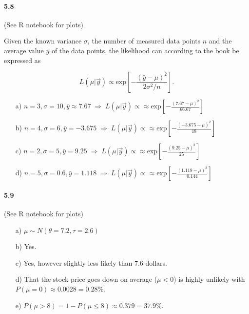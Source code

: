 \documentclass[fontsize=11pt,DIV=18,parskip=half]{scrartcl}
\begin{document}
\paragraph{5.8} (See R notebook for plots)

Given the known variance $\sigma$, the number of measured data points $n$ and the average value $\bar{y}$ of the data points, the likelihood can according to the book be expressed as

\begin{equation*}
L(\mu|\vec{y}) \propto \text{exp}\left[-\frac{(\bar{y}-\mu)^2}{2\sigma^2/n}\right].
\end{equation*}

\begin{enumerate}
\item[a)] $n = 3, \sigma=10, \bar{y}\approx 7.67\; \Rightarrow \; L(\mu|\vec{y}) \propto\approx \text{exp}\left[-\frac{(7.67-\mu)^2}{66.67}\right]$
\item[b)] $n = 4, \sigma=6, \bar{y}= -3.675\; \Rightarrow \; L(\mu|\vec{y}) \propto\approx \text{exp}\left[-\frac{(-3.675-\mu)^2}{18}\right]$
\item[c)] $n = 2, \sigma=5, \bar{y}= 9.25\; \Rightarrow \; L(\mu|\vec{y}) \propto\approx \text{exp}\left[-\frac{(9.25-\mu)^2}{25}\right]$
\item[d)] $n = 5, \sigma=0.6, \bar{y}= 1.118\; \Rightarrow \; L(\mu|\vec{y}) \propto\approx \text{exp}\left[-\frac{(1.118-\mu)^2}{0.144}\right]$
\end{enumerate}

\paragraph{5.9} (See R notebook for plots)
\begin{enumerate}
\item[a)] $\mu \sim N(\theta=7.2, \tau=2.6)$
\item[b)] Yes.
\item[c)] Yes, however slightly less likely than 7.6 dollars.
\item[d)] That the stock price goes down on average ($\mu < 0$) is highly unlikely with $P(\mu=0) \approx 0.0028 = 0.28\%$.
\item[e)] $P(\mu > 8) = 1 - P(\mu \leq 8) \approx 0.379 = 37.9\%$.
\end{enumerate}
\end{document}
